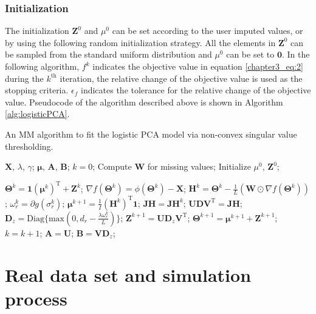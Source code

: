 \subsubsection*{Initialization}
The initialization $\mathbf{Z}^0$ and $\mu^0$ can be set according to the user imputed values, or by using the following random initialization strategy. All the elements in $\mathbf{Z}^0$ can be sampled from the standard uniform distribution and $\mu^0$ can be set to $\mathbf{0}$. In the following algorithm, $f^k$ indicates the objective value in equation \ref{chapter3_eq:2} during the $k^{\text{th}}$ iteration, the relative change of the objective value is used as the stopping criteria. $\epsilon_f$ indicates the tolerance for the relative change of the objective value. Pseudocode of the algorithm described above is shown in Algorithm \ref{alg:logisticPCA}.

\begin{algorithm}[htb]
  \caption{An MM algorithm to fit the logistic PCA model via non-convex singular value thresholding.}
  \label{alg:logisticPCA}
  \begin{algorithmic}[1]
    \Require
      $\mathbf{X}$, $\lambda$, $\gamma$;
    \Ensure
      $\bm{\mu}$, $\mathbf{A}$, $\mathbf{B}$;
    \State $k = 0$;
    \State Compute $\mathbf{W}$ for missing values;
    \State Initialize $\mu^0$, $\mathbf{Z}^0$;

        \State $\mathbf{\Theta}^k = \mathbf{1}(\bm{\mu}^k)^{\text{T}} + \mathbf{Z}^k$;
        \State $\nabla f(\mathbf{\Theta}^{k})= \phi(\mathbf{\Theta}^k)-\mathbf{X}$;
        \State $\mathbf{H}^k = \mathbf{\Theta}^k - \frac{1}{L} (\mathbf{W}\odot \nabla f(\mathbf{\Theta}^k))$;
        \State $\omega_r^k = \partial g(\sigma_r^k)$;
        \State $\bm{\mu}^{k+1} = \frac{1}{I}(\mathbf{H}^{k})^{\text{T}} \mathbf{1}$;
        \State $\mathbf{JH}=\mathbf{J}\mathbf{H}^{k}$;
        \State $\mathbf{UDV}^{\text{T}} = \mathbf{JH}$;
        \State $\mathbf{D}_{z} = \text{Diag}\{\text{max}(0, d_{r}-\frac{\lambda \omega_r^k}{L}) \}$;
        \State $\mathbf{Z}^{k+1} = \mathbf{U}\mathbf{D}_{z}\mathbf{V}^{\text{T}}$;
        \State $\mathbf{\Theta}^{k+1} = \bm{\mu}^{k+1} + \mathbf{Z}^{k+1}$;
        \State $k=k+1$;
    \EndWhile
    \State $\mathbf{A} = \mathbf{U}$;
    \State $\mathbf{B} = \mathbf{V}\mathbf{D}_{z}$;
  \end{algorithmic}
\end{algorithm}

\section{Real data set and simulation process}
